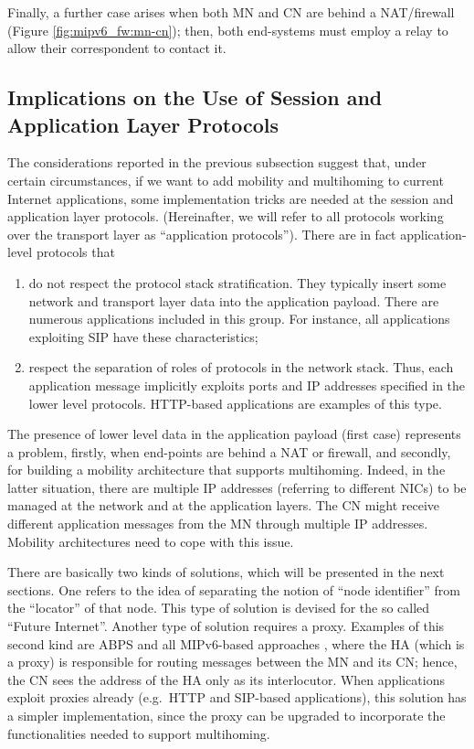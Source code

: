 \documentclass[preprint,12pt]{elsarticle}
\begin{document}
Finally, a further case arises when both MN and CN are behind a NAT/fire\-wall 
(Figure \ref{fig:mipv6_fw:mn-cn}); then, both end-systems must employ a relay to allow their correspondent to contact it.



\subsection{Implications on the Use of Session and Application Layer Protocols}
\label{sec:session}

The considerations reported in the previous subsection suggest that, under 
certain circumstances, if we want to add mobility and multihoming to current 
Internet applications,
some implementation tricks are needed at the session and application layer 
protocols. (Hereinafter, we will refer to all protocols working over the 
transport layer as ``application protocols''). There are in fact
application-level protocols that
\begin{enumerate}
 \item do not respect the protocol stack stratification. They typically insert some network and transport layer data into the application payload. There are numerous applications included in this group. For instance, all applications exploiting SIP have these characteristics;
 \item respect the separation of roles of protocols in the network stack. Thus, 
each application message implicitly exploits ports and IP addresses specified 
in the lower level protocols. HTTP-based applications are examples of this 
type. 
\end{enumerate}

The presence of lower level data in the application payload (first case) represents a problem, firstly, when end-points are behind a NAT or firewall, and secondly, for building a mobility architecture that supports multihoming. Indeed, in the latter situation,
there are multiple IP addresses (referring to 
different NICs) to be managed at the network and at the application layers. The 
CN might receive different application messages from the MN through multiple IP 
addresses. 
Mobility architectures need to cope with this issue. 

There are basically two kinds of solutions, which will be presented in the next 
sections.
One refers to the idea of separating the notion of ``node identifier'' from the 
``locator'' of that node. This type of solution is devised for the so called 
``Future Internet''. Another type of solution requires a 
proxy. 
Examples of this second kind are ABPS \cite{GhiniJSS} and all MIPv6-based 
approaches \cite{mipv6}, where the \ac{HA} (which is a proxy) is responsible for 
routing messages between the MN and its CN; hence, the CN sees the address of the 
\ac{HA} only as its interlocutor.
When applications exploit proxies already (e.g.~HTTP and SIP-based 
applications), this solution has a simpler implementation, since the proxy can 
be upgraded to incorporate the functionalities needed to support multihoming. 
\end{document}
